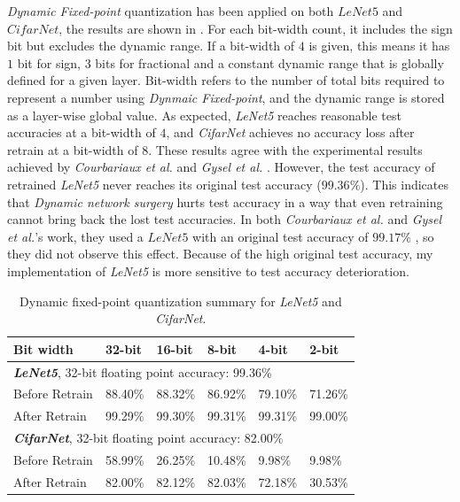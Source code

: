 \documentclass[a4paper,12pt]{report}
\begin{document}
\textit{Dynamic Fixed-point} quantization has been applied on both $LeNet5$
and $CifarNet$, the results are shown in .
For each bit-width count, it includes the sign bit but excludes the dynamic range.
If a bit-width of $4$ is given, this means it has $1$ bit for sign, $3$ bits for
fractional and a constant dynamic range that is globally defined for a given layer.
Bit-width refers to the number of total bits required to represent a number using
\textit{Dynmaic Fixed-point}, and the dynamic range is stored as a layer-wise global
value.
As expected, \textit{LeNet5} reaches reasonable test accuracies at a bit-width of
$4$, and \textit{CifarNet} achieves no accuracy loss after retrain at a bit-width
of $8$.
These results agree with the experimental results achieved by \textit{Courbariaux et al.}
\cite{courbariaux2014training} and \textit{Gysel et al.} \cite{Gysel}.
However, the test accuracy of retrained \textit{LeNet5} never reaches its
original test accuracy ($99.36\%$).
This indicates that \textit{Dynamic network surgery} hurts test accuracy in a way
that even retraining cannot bring back the lost test accuracies.
In both \textit{Courbariaux et al.} and \textit{Gysel et al.}'s work, they used
a $LeNet5$ with an original test accuracy of $99.17\%$ \cite{courbariaux2014training,Gysel},
so they did not observe this effect.
Because of the high original test accuracy, my implementation of \textit{LeNet5}
is more sensitive to test accuracy deterioration.

\begin{table}[!h]
  \centering
  \begin{tabular}{llllll}
    \hline
    \hline
    Bit width               &32-bit     &16-bit     &8-bit    &4-bit    &2-bit  \\
    \hline
    \multicolumn{5}{l}{\textbf{\textit{LeNet5}}, 32-bit floating point accuracy: 99.36\%}\\
    \hline
    \hline
    Before Retrain          &88.40\%    &88.32\%    &86.92\%    &79.10\%  &71.26\%\\
    After Retrain           &99.29\%    &99.30\%    &99.31\%    &99.31\%  &99.00\%\\
    \hline
    \hline
    \multicolumn{5}{l}{\textbf{\textit{CifarNet}}, 32-bit floating point accuracy: 82.00\%}\\
    \hline
    Before Retrain          &58.99\%        &26.25\%    &10.48\%  &9.98\%  &9.98\%\\
    After Retrain           &82.00\%        &82.12\%    &82.03\%  &72.18\%  &30.53\%\\
    \hline
    \hline
  \end{tabular}
  \caption{Dynamic fixed-point quantization summary for \textit{LeNet5} and \textit{CifarNet}.}
  \label{tab:dfp_sum}
\end{table}
\end{document}
